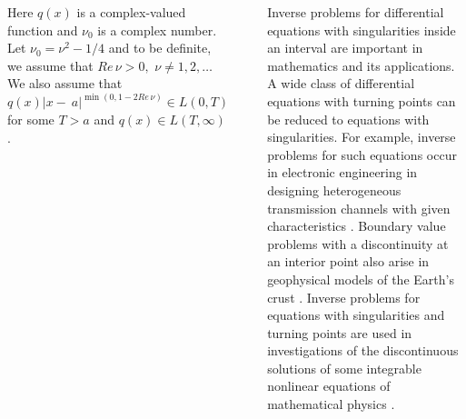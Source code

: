 \documentclass[blockverticalspace=20mm,colspace=20mm,25pt]{tikzposter} %
\begin{document}
\begin{columns}
{Here $q(x)$ is a complex-valued function and $\nu_0$ is a complex number. Let $\nu_0=\nu^2-1/4$ and to be definite, we assume that  $Re\,\nu>0,$ $\nu\neq 1,2,\ldots$ 
We also assume that 
$q(x)|x-~a|^{\min(0,1-2Re\,\nu)} \in L(0,T)$ for some $T>a$ and $q(x)\in L(T,\infty)$. 

\begin{tikzfigure}[$a\in(0,\infty)$]
\end{tikzfigure}



Inverse problems for differential equations with singularities inside an 
interval are important in mathematics and its applications. A wide class of differential
equations with turning points can be reduced to equations with singularities. For example, inverse
problems for such equations occur in electronic engineering in designing heterogeneous transmission
channels with given characteristics \cite{yurko-freiling-99}. Boundary value problems with a discontinuity at an interior
point also arise in geophysical models of the Earth's crust \cite{lapwood81}. Inverse problems for equations
with singularities and turning points are used in investigations of the discontinuous solutions of
some integrable nonlinear equations of mathematical physics \cite{const98}. 

}




\end{columns}
\end{document}
